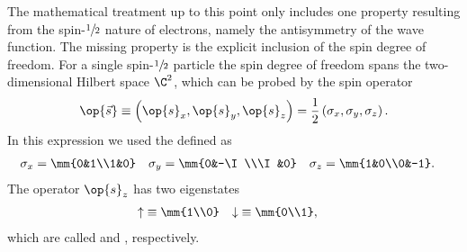 \begin{rem}
	\label{rem:Spin}
	The mathematical treatment up to this point
	only includes one property resulting from the spin-$\sfrac12$ nature
	of electrons,
	namely the antisymmetry of the wave function.
	The missing property is the explicit inclusion of the spin degree of freedom.
	For a single spin-$\sfrac12$ particle the spin degree of freedom
	spans the two-dimensional Hilbert space $\C^2$,
	which can be probed by the spin operator
	\[ \op{\vec{s}} \equiv \left( \op{s}_x, \op{s}_y, \op{s}_z \right)
		= \frac12 \left( \sigma_x, \sigma_y, \sigma_z \right). \]
	In this expression we used the  defined as
	\begin{align}
		\label{eqn:PauliMatrices}
		\sigma_x &= \mm{0&1\\1&0} &
		\sigma_y &= \mm{0&-\I\\\I&0} &
		\sigma_z &= \mm{1&0\\0&-1}.
	\end{align}
	The operator $\op{s}_z$ has two eigenstates
	\begin{align*}
		\uparrow &\equiv \mm{1\\0} & \downarrow &\equiv \mm{0\\1},
	\end{align*}
	which are called  and , respectively.


\end{rem}
